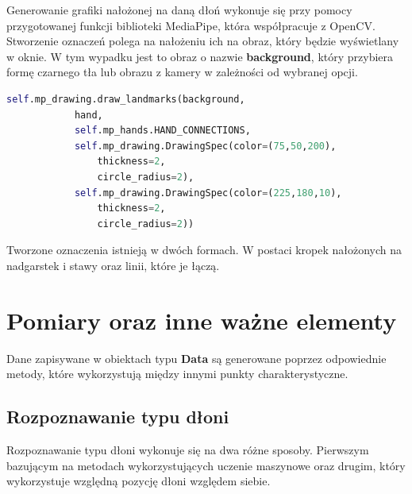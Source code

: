 \quad Generowanie grafiki nałożonej na daną dłoń wykonuje się przy pomocy przygotowanej funkcji biblioteki MediaPipe, która współpracuje z OpenCV. Stworzenie oznaczeń polega na nałożeniu ich na obraz, który będzie wyświetlany w oknie. W tym wypadku jest to obraz o nazwie \textbf{background}, który przybiera formę czarnego tła lub obrazu z kamery w zależności od wybranej opcji. \newline

\begin{lstlisting}[language=python, style=programming, captionpos=b, caption={Obrys dłoni}]
    self.mp_drawing.draw_landmarks(background, 
            hand, 
            self.mp_hands.HAND_CONNECTIONS,
            self.mp_drawing.DrawingSpec(color=(75,50,200), 
                thickness=2, 
                circle_radius=2),
            self.mp_drawing.DrawingSpec(color=(225,180,10), 
                thickness=2, 
                circle_radius=2))
\end{lstlisting}

\quad Tworzone oznaczenia istnieją w dwóch formach. W postaci kropek nałożonych na nadgarstek i stawy oraz linii, które je łączą. 

\section{Pomiary oraz inne ważne elementy}
\quad Dane zapisywane w obiektach typu \textbf{Data} są generowane poprzez odpowiednie metody, które wykorzystują między innymi punkty charakterystyczne. 

\subsection{Rozpoznawanie typu dłoni}

\quad Rozpoznawanie typu dłoni wykonuje się na dwa różne sposoby. Pierwszym bazującym na metodach wykorzystujących uczenie maszynowe oraz drugim, który wykorzystuje względną pozycję dłoni względem siebie.  

